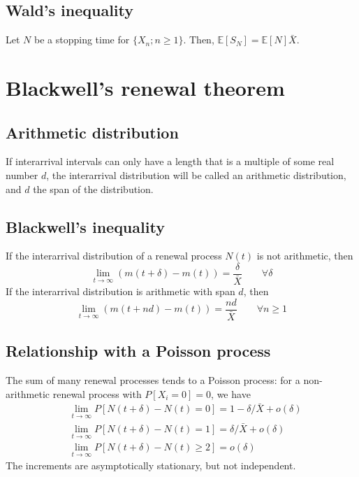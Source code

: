 \documentclass[12pt, openany]{report}
\newcommand{\E}{\mathbb{E}}
\theoremstyle{definition}
\begin{document}
\subsection{Wald's inequality}
Let $N$ be a stopping time for $\{X_n;n\ge 1\}$. Then, $\E[S_N]=\E[N]\bar X$.
\section{Blackwell's renewal theorem}
\subsection{Arithmetic distribution}
If interarrival intervals can only have a length that is a multiple of some real number $d$, the interarrival distribution will be called an arithmetic distribution, and $d$ the span of the distribution. 
\subsection{Blackwell's inequality}
If the interarrival distribution of a renewal process $N(t)$ is not arithmetic, then 
\begin{equation}
  \lim_{t\to\infty } \left(m(t+\delta)-m(t)\right) = \frac{\delta}{\bar X} \qquad \forall \delta 
\end{equation}
If the interarrival distribution is arithmetic with span $d$, then 
\begin{equation}
  \lim_{t\to\infty } \left(m(t+nd)-m(t)\right) = \frac{nd}{\bar X} \qquad \forall n\ge 1
\end{equation}
\subsection{Relationship with a Poisson process}
The sum of many renewal processes tends to a Poisson process: for a non-arithmetic renewal process with $P[X_i=0]=0$, we have 
\begin{equation}
  \begin{aligned}
    &\lim_{t\to\infty} P[N(t+\delta)-N(t)=0]=1-\delta/\bar X + o(\delta)\\
    &\lim_{t\to\infty} P[N(t+\delta)-N(t)=1]=\delta/\bar X + o(\delta)\\
	&\lim_{t\to\infty} P[N(t+\delta)-N(t)\ge 2]=o(\delta)
  \end{aligned}
\end{equation}
The increments are asymptotically stationary, but not independent. 
\end{document}
